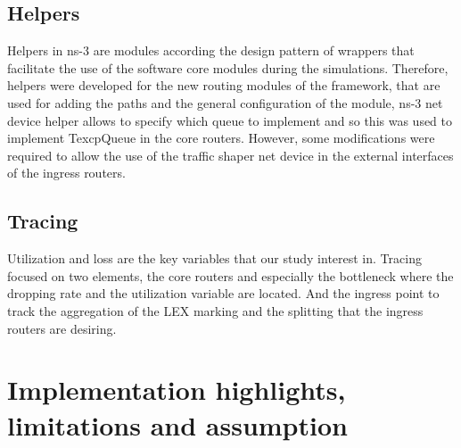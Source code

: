 \subsection{Helpers}
Helpers in ns-3 are modules according the design pattern of wrappers that facilitate the use of the software core modules during the simulations. Therefore, helpers were developed for the new routing modules of the framework, that are used for adding the paths and the general configuration of the module, ns-3 net device helper allows to specify which queue to implement and so this was used to implement TexcpQueue in the core routers. However, some modifications were required to allow the use of the traffic shaper net device in the external interfaces of the ingress routers. 

\subsection{Tracing}

Utilization and loss are the key variables that our study interest in. Tracing focused on two elements, the core routers and especially the bottleneck where the dropping rate and the utilization variable are located. And the ingress point to track the aggregation of the LEX marking and the  splitting that the ingress routers are desiring.

\section{Implementation highlights, limitations and assumption}
